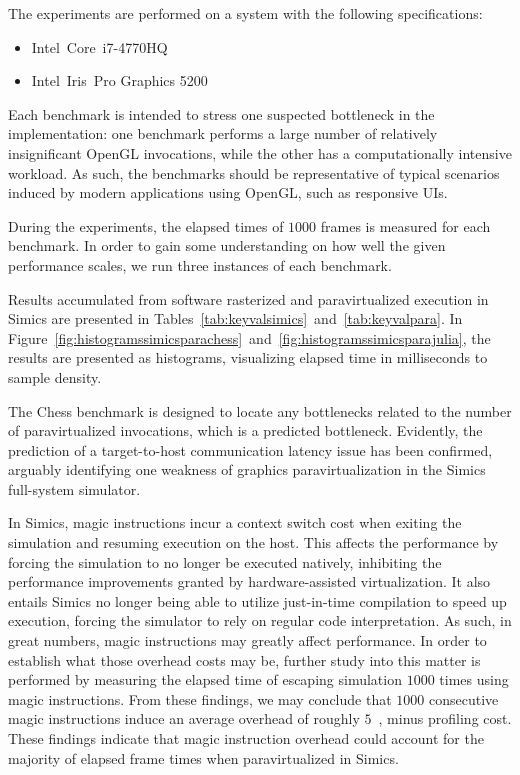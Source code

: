 \documentclass{article}
\begin{document}
The experiments are performed on a system with the following specifications:
\begin{itemize}
\item Intel\circledR\ Core\texttrademark\ i7-4770HQ
\item Intel\circledR\ Iris\texttrademark\ Pro Graphics 5200
\end{itemize}

Each benchmark is intended to stress one suspected bottleneck in the implementation: one benchmark performs a large number of relatively insignificant OpenGL invocations, while the other has a computationally intensive workload.
As such, the benchmarks should be representative of typical scenarios induced by modern applications using OpenGL, such as responsive UIs.

During the experiments, the elapsed times of $1000$ frames is measured for each benchmark.
In order to gain some understanding on how well the given performance scales, we run three instances of each benchmark.

Results accumulated from software rasterized and paravirtualized execution in Simics are presented in Tables~\ref{tab:keyvalsimics}~and~\ref{tab:keyvalpara}.
In Figure~\ref{fig:histogramssimicsparachess}~and~\ref{fig:histogramssimicsparajulia}, the results are presented as histograms, visualizing elapsed time in milliseconds to sample density.

The Chess benchmark is designed to locate any bottlenecks related to the number of paravirtualized invocations, which is a predicted bottleneck.
Evidently, the prediction of a target-to-host communication latency issue has been confirmed, arguably identifying one weakness of graphics paravirtualization in the Simics full-system simulator.

In Simics, magic instructions incur a context switch cost when exiting the simulation and resuming execution on the host.
This affects the performance by forcing the simulation to no longer be executed natively, inhibiting the performance improvements granted by hardware-assisted virtualization.
It also entails Simics no longer being able to utilize just-in-time compilation to speed up execution, forcing the simulator to rely on regular code interpretation.
As such, in great numbers, magic instructions may greatly affect performance.
In order to establish what those overhead costs may be, further study into this matter is performed by measuring the elapsed time of escaping simulation $1000$ times using magic instructions.
From these findings, we may conclude that $1000$ consecutive magic instructions induce an average overhead of roughly $5$~\milli\second , minus profiling cost.
These findings indicate that magic instruction overhead could account for the majority of elapsed frame times when paravirtualized in Simics.
\end{document}
